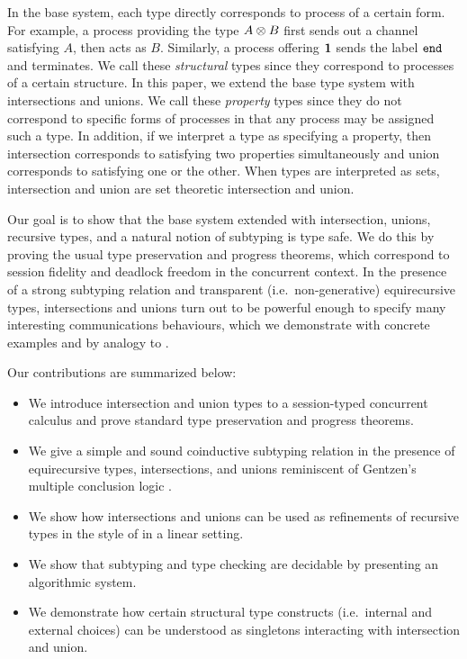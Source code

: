 \documentclass[a4paper,USenglish]{lipics-v2016}
\begin{document}
In the base system, each type directly corresponds to process of a certain form. For example, a process providing the type $A \otimes B$ first sends out a channel satisfying $A$, then acts as $B$. Similarly, a process offering $\mathbf{1}$ sends the label $\texttt{end}$ and terminates. We call these \emph{structural} types since they correspond to processes of a certain structure. In this paper, we extend the base type system with intersections and unions. We call these \emph{property} types since they do not correspond to specific forms of processes in that any process may be assigned such a type. In addition, if we interpret a type as specifying a property, then intersection corresponds to satisfying two properties simultaneously and union corresponds to satisfying one or the other. When types are interpreted as sets, intersection and union are set theoretic intersection and union. 

Our goal is to show that the base system extended with intersection, unions, recursive types, and a natural notion of subtyping is type safe. We do this by proving the usual type preservation and progress theorems, which correspond to session fidelity and deadlock freedom in the concurrent context. In the presence of a strong subtyping relation and transparent (i.e.\ non-generative)  equirecursive types, intersections and unions turn out to be powerful enough to specify many interesting communications behaviours, which we demonstrate with concrete examples and by analogy to \cite{FreemanP91}.

Our contributions are summarized below:
\begin{itemize}
  \item We introduce intersection and union types to a session-typed concurrent calculus and prove standard type preservation and progress theorems.
  \item We give a simple and sound coinductive subtyping relation in the presence of equirecursive types, intersections, and unions reminiscent of Gentzen's multiple conclusion logic \cite{Gentzen35, Girard87}.
  \item We show how intersections and unions can be used as refinements of recursive types in the style of \cite{FreemanP91} in a linear setting.
  \item We show that subtyping and type checking are decidable by presenting an algorithmic system.
  \item We demonstrate how certain structural type constructs (i.e.\ internal and external choices) can be understood as singletons interacting with intersection and union.
\end{itemize}
\end{document}
